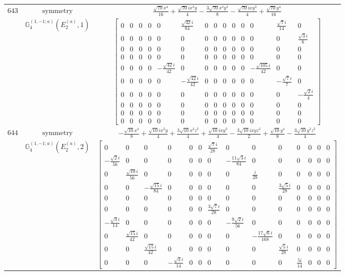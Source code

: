 \documentclass[fleqn,8pt,landscape]{jsarticle}
\begin{document}
\begin{longtable}{ccc}
$ 643 $ & $ \text{symmetry} $ & $ \frac{\sqrt{70} x^{4}}{16} + \frac{\sqrt{70} i x^{3} y}{4} - \frac{3 \sqrt{70} x^{2} y^{2}}{8} - \frac{\sqrt{70} i x y^{3}}{4} + \frac{\sqrt{70} y^{4}}{16} $ \\
$  $ & $ \mathbb{G}_{4}^{(1,-1;a)}(E_{2}^{(a)},1) $ & $ \begin{bmatrix} 0 & 0 & 0 & 0 & 0 & \frac{\sqrt{42} i}{84} & 0 & 0 & 0 & 0 & 0 & 0 & \frac{\sqrt{7} i}{14} & 0 \\ 0 & 0 & 0 & 0 & 0 & 0 & 0 & 0 & 0 & 0 & 0 & 0 & 0 & \frac{\sqrt{3} i}{6} \\ 0 & 0 & 0 & 0 & 0 & 0 & 0 & 0 & 0 & 0 & 0 & 0 & 0 & 0 \\ 0 & 0 & 0 & 0 & 0 & 0 & 0 & 0 & 0 & 0 & 0 & 0 & 0 & 0 \\ 0 & 0 & 0 & 0 & - \frac{\sqrt{42} i}{42} & 0 & 0 & 0 & 0 & 0 & 0 & - \frac{\sqrt{105} i}{42} & 0 & 0 \\ 0 & 0 & 0 & 0 & 0 & - \frac{\sqrt{42} i}{42} & 0 & 0 & 0 & 0 & 0 & 0 & - \frac{\sqrt{7} i}{7} & 0 \\ 0 & 0 & 0 & 0 & 0 & 0 & 0 & 0 & 0 & 0 & 0 & 0 & 0 & - \frac{\sqrt{2} i}{4} \\ 0 & 0 & 0 & 0 & 0 & 0 & 0 & 0 & 0 & 0 & 0 & 0 & 0 & 0 \\ 0 & 0 & 0 & 0 & 0 & 0 & 0 & 0 & 0 & 0 & 0 & 0 & 0 & 0 \\ 0 & 0 & 0 & 0 & 0 & 0 & 0 & 0 & 0 & 0 & 0 & 0 & 0 & 0 \end{bmatrix} $ \\ \hline
$ 644 $ & $ \text{symmetry} $ & $ - \frac{\sqrt{10} x^{4}}{8} + \frac{\sqrt{10} i x^{3} y}{4} + \frac{3 \sqrt{10} x^{2} z^{2}}{4} + \frac{\sqrt{10} i x y^{3}}{4} - \frac{3 \sqrt{10} i x y z^{2}}{2} + \frac{\sqrt{10} y^{4}}{8} - \frac{3 \sqrt{10} y^{2} z^{2}}{4} $ \\
$  $ & $ \mathbb{G}_{4}^{(1,-1;a)}(E_{2}^{(a)},2) $ & $ \begin{bmatrix} 0 & 0 & 0 & 0 & 0 & 0 & \frac{\sqrt{7} i}{28} & 0 & 0 & 0 & 0 & 0 & 0 & 0 \\ - \frac{\sqrt{2} i}{56} & 0 & 0 & 0 & 0 & 0 & 0 & - \frac{11 \sqrt{3} i}{84} & 0 & 0 & 0 & 0 & 0 & 0 \\ 0 & \frac{\sqrt{10} i}{56} & 0 & 0 & 0 & 0 & 0 & 0 & \frac{i}{28} & 0 & 0 & 0 & 0 & 0 \\ 0 & 0 & - \frac{\sqrt{15} i}{84} & 0 & 0 & 0 & 0 & 0 & 0 & \frac{3 \sqrt{5} i}{28} & 0 & 0 & 0 & 0 \\ 0 & 0 & 0 & 0 & 0 & 0 & 0 & 0 & 0 & 0 & 0 & 0 & 0 & 0 \\ 0 & 0 & 0 & 0 & 0 & 0 & \frac{3 \sqrt{7} i}{28} & 0 & 0 & 0 & 0 & 0 & 0 & 0 \\ - \frac{\sqrt{3} i}{14} & 0 & 0 & 0 & 0 & 0 & 0 & - \frac{9 \sqrt{2} i}{56} & 0 & 0 & 0 & 0 & 0 & 0 \\ 0 & \frac{\sqrt{15} i}{42} & 0 & 0 & 0 & 0 & 0 & 0 & - \frac{17 \sqrt{6} i}{168} & 0 & 0 & 0 & 0 & 0 \\ 0 & 0 & \frac{\sqrt{15} i}{42} & 0 & 0 & 0 & 0 & 0 & 0 & \frac{\sqrt{5} i}{28} & 0 & 0 & 0 & 0 \\ 0 & 0 & 0 & - \frac{\sqrt{3} i}{14} & 0 & 0 & 0 & 0 & 0 & 0 & \frac{5 i}{14} & 0 & 0 & 0 \end{bmatrix} $ \\ \hline

\end{longtable}
\end{document}
